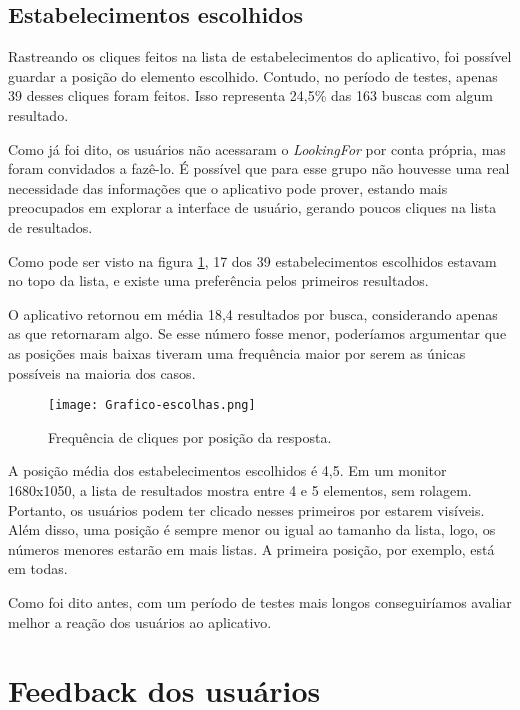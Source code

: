 \subsection{Estabelecimentos escolhidos}
\label{subsec:estabescol}

Rastreando os cliques feitos na lista de estabelecimentos do aplicativo, foi possível guardar a posição do elemento escolhido. Contudo, no período de testes, apenas 39 desses cliques foram feitos. Isso representa 24,5\% das 163 buscas com algum resultado.

Como já foi dito, os usuários não acessaram o \emph{LookingFor} por conta própria, mas foram convidados a fazê-lo. É possível que para esse grupo não houvesse uma real necessidade das informações que o aplicativo pode prover, estando mais preocupados em explorar a interface de usuário, gerando poucos cliques na lista de resultados.

Como pode ser visto na figura \ref{fig:freqcliq}, 17 dos 39 estabelecimentos escolhidos estavam no topo da lista, e existe uma preferência pelos primeiros resultados.

O aplicativo retornou em média 18,4 resultados por busca, considerando apenas as que retornaram algo. Se esse número fosse menor, poderíamos argumentar que as posições mais baixas tiveram uma frequência maior por serem as únicas possíveis na maioria dos casos.

\begin{figure}[!h]
  \centering
  \texttt{[image: Grafico-escolhas.png]} 
  \caption{Frequência de cliques por posição da resposta.}
  \label{fig:freqcliq}
\end{figure}

A posição média dos estabelecimentos escolhidos é 4,5. Em um monitor 1680x1050, a lista de resultados mostra entre 4 e 5 elementos, sem rolagem. Portanto, os usuários podem ter clicado nesses primeiros por estarem visíveis. Além disso, uma posição é sempre menor ou igual ao tamanho da lista, logo, os números menores estarão em mais listas. A primeira posição, por exemplo, está em todas.

Como foi dito antes, com um período de testes mais longos conseguiríamos avaliar melhor a reação dos usuários ao aplicativo.

\section{Feedback dos usuários}
\label{sec:feedback}


